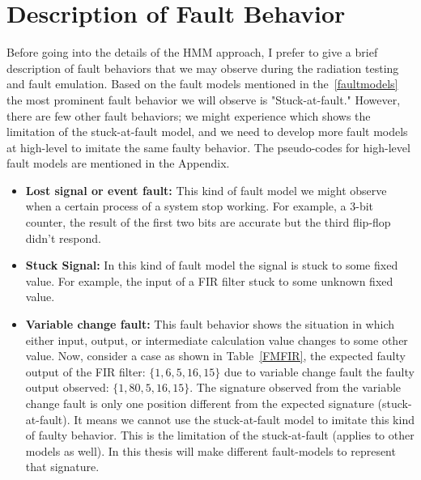 \section{Description of Fault Behavior}
Before going into the details of the HMM approach, I prefer to give a brief description of fault behaviors that we may observe during the radiation testing and fault emulation. Based on the fault models mentioned in the~\ref{faultmodels} the most prominent fault behavior we will observe is "Stuck-at-fault." However, there are few other fault behaviors; we might experience which shows the limitation of the stuck-at-fault model, and we need to develop more fault models at high-level to imitate the same faulty behavior. The pseudo-codes for high-level fault models are mentioned in the Appendix.
\begin{itemize}
\item \textbf{Lost signal or event fault:} This kind of fault model we might observe when a certain process of a system stop working. For example, a 3-bit counter, the result of the first two bits are accurate but the third flip-flop didn't respond.

\item \textbf{Stuck Signal:} In this kind of fault model the signal is stuck to some fixed value. For example, the input of a FIR filter stuck to some unknown fixed value. 
 
\item \textbf{Variable change fault:} This fault behavior shows the situation in which either input, output, or intermediate calculation value changes to some other value. Now, consider a case as shown in Table~\ref{FMFIR}, the expected faulty output of the FIR filter: $\{1, 6, 5, 16, 15\}$ due to variable change fault the faulty output observed: $\{1, 80, 5, 16, 15\}$. The signature observed from the variable change fault is only one position different from the expected signature (stuck-at-fault).  It means we cannot use the stuck-at-fault model to imitate this kind of faulty behavior. This is  the limitation of the stuck-at-fault (applies to other models as well). In this thesis will make different fault-models to represent that signature.
\begin{table}[tb!]
\center
\caption{Variable Change Fault Models FIR}
\label{FMFIR}
\end{table}
\end{itemize}
